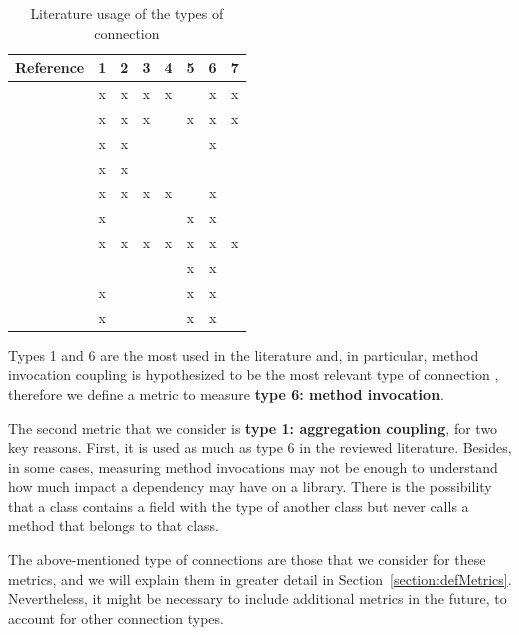 \begin{table}[ht!]
    \centering
    \begin{tabular}{|l|c|c|c|c|c|c|c|}
         \hline
         Reference                      & 1 & 2 & 3 & 4 & 5 & 6 & 7 \\\hline
         \cite{eder1994coupling}        & x & x & x & x &   & x & x \\\hline
         \cite{hitz1995measuring}       & x & x & x &   & x & x & x \\\hline
         \cite{briand1997investigation} & x & x &   &   &   & x &   \\\hline
         \cite{wilkie2000coupling}      & x & x &   &   &   &   &   \\\hline
         \cite{yang2005detecting}       & x & x & x & x &   & x &   \\\hline
         \cite{gui2007ranking}          & x &   &   &   & x & x &   \\\hline
         \cite{gupta2009package}        & x & x & x & x & x & x & x \\\hline
         \cite{harrison1998coupling}    &   &   &   &   & x & x &   \\\hline
         \cite{du2004refactoring}       & x &   &   &   & x & x &   \\\hline
         \cite{koetter2019assessing}    & x &   &   &   & x & x &   \\\hline
    \end{tabular}
    \caption{Literature usage of the types of connection}
    \label{tab:type-con-literature}
\end{table}

Types 1 and 6 are the most used in the literature and, in particular, method invocation coupling is
hypothesized to be the most relevant type of connection \cite{briand1999unified}, therefore we define a metric to measure \textbf{type 6: method invocation}.

The second metric that we consider is \textbf{type 1: aggregation coupling}, for two key reasons. First, it is used as much as type 6 in the reviewed literature. Besides, in some cases, measuring method invocations may not be enough to understand how much impact a dependency may have on a library. There is the possibility that a class contains a field with the type of another class but never calls a method that belongs to that class.

The above-mentioned type of connections are those that we consider for these metrics, and we will explain them in greater detail in Section~\ref{section:defMetrics}. Nevertheless, it might be necessary to include additional metrics in the future, to account for other connection types.

